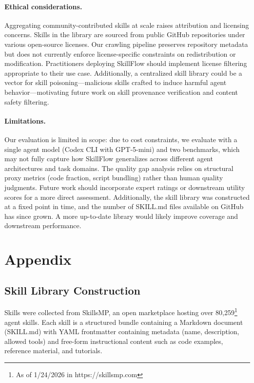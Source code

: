 \documentclass[11pt]{article}
\begin{document}
\paragraph{Ethical considerations.}
Aggregating community-contributed skills at scale raises attribution and licensing concerns.
Skills in the library are sourced from public GitHub repositories under various open-source licenses. Our crawling pipeline preserves repository metadata but does not currently enforce license-specific constraints on redistribution or modification.
Practitioners deploying SkillFlow should implement license filtering appropriate to their use case.
Additionally, a centralized skill library could be a vector for skill poisoning---malicious skills crafted to induce harmful agent behavior---motivating future work on skill provenance verification and content safety filtering.

\paragraph{Limitations.}
Our evaluation is limited in scope: due to cost constraints, we evaluate with a single agent model (Codex CLI with GPT-5-mini) and two benchmarks, which may not fully capture how SkillFlow generalizes across different agent architectures and task domains.
The quality gap analysis relies on structural proxy metrics (code fraction, script bundling) rather than human quality judgments. Future work should incorporate expert ratings or downstream utility scores for a more direct assessment.
Additionally, the skill library was constructed at a fixed point in time, and the number of SKILL.md files available on GitHub has since grown. A more up-to-date library would likely improve coverage and downstream performance.




\appendix
\section{Appendix}
\label{sec:appendix}

\subsection{Skill Library Construction}
\label{sec:skill_library_construction}

Skills were collected from SkillsMP, an open marketplace hosting over 80,259\footnote{As of 1/24/2026 in https://skillsmp.com} agent skills.
Each skill is a structured bundle containing a Markdown document (SKILL.md) with YAML frontmatter containing metadata (name, description, allowed tools) and free-form instructional content such as code examples, reference material, and tutorials.
\end{document}
